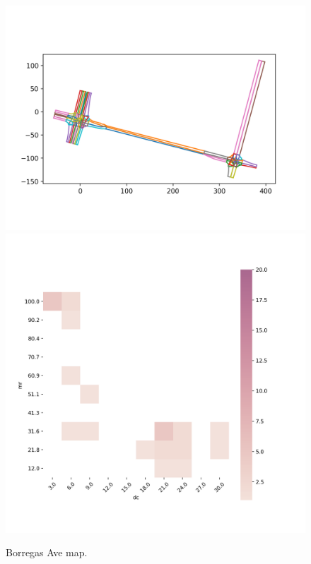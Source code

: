 \documentclass[conference]{IEEEtran}
\begin{document}
\begin{figure}[!tp]
  \includegraphics[width=\linewidth]{images/map_borregasave}
  \includegraphics[width=\linewidth]{images/feature_borregasave}
  \caption{Borregas Ave map.}
    \label{fig:feature-maps-borregas}
\endminipage\hfill
{}%

\end{figure}
\end{document}
